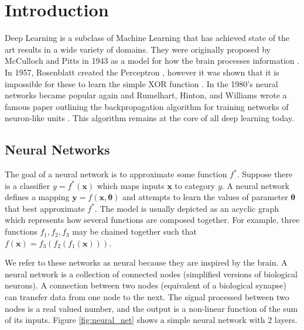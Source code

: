 
\chapter{Introduction}\label{cha:introduction}

Deep Learning is a subclass of Machine Learning that has achieved state of the art results in a wide variety of domains.
They were originally proposed by McCulloch and Pitts in 1943 as a model for how the brain processes information \cite{McCulloch_Pitts_1943}.
In 1957, Rosenblatt created the Perceptron \cite{Rosenblatt_1957, Rosenblatt_1958}, however it was shown that it is impossible for these to learn the simple XOR function \cite{Minsky_Papert_1988}.
In the 1980's neural networks became popular again and Rumelhart, Hinton, and Williams wrote a famous paper outlining the backpropagation algorithm for training networks of neuron-like units \cite{Rumelhart_Hinton_Williams_1986}.
This algorithm remains at the core of all deep learning today.


\section{Neural Networks}\label{sec:neural_network_int}
The goal of a neural network is to approximate some function $f^*$.
Suppose there is a classifier $y=f^*(\bm{x})$ which maps inputs $\bm{x}$ to category $y$.
A neural network defines a mapping $\bm{y}=f(\bm{x}, \bm{\theta})$ and attempts to learn the values of parameter $\bm{\theta}$ that best approximate $f^*$.
The model is usually depicted as an acyclic graph which represents how several functions are composed together.
For example, three functions $f_1, f_2, f_3$ may be chained together such that $f(\bm{x}) = f_3(f_2(f_1(\bm{x})))$.

We refer to these networks as neural because they are inspired by the brain.
A neural network is a collection of connected nodes (simplified versions of  biological neurons).
A connection between two nodes (equivalent of a biological synapse) can transfer data from one node to the next.
The signal processed between two nodes is a real valued number, and the output is a non-linear function of the sum of its inputs.
Figure \ref{fig:neural_net} shows a simple neural network with 2 layers.

\begin{figure}[hbtp!]
    \centering
\end{figure}

